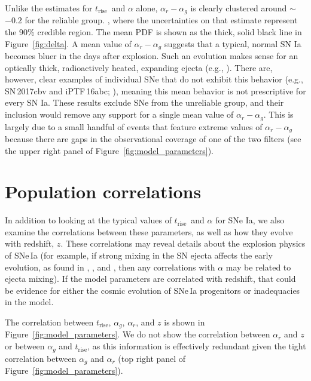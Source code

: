 \documentclass[twocolumn]{./aastex63}
\newcommand{\trise}{$t_\mathrm{rise}$}
\begin{document}
Unlike the estimates for \trise\ and $\alpha$ alone, $\alpha_r - \alpha_g$ is
clearly clustered around $\sim$${-0.2}$ for the reliable group.
, where the uncertainties on that estimate represent
the 90\% credible region. The mean PDF  is shown as the thick, solid black line in
Figure~\ref{fig:delta}. A mean value of $\alpha_r - \alpha_g$ suggests that a
typical, normal SN Ia becomes bluer in the days after explosion. Such an
evolution makes sense for an optically thick, radioactively heated, expanding
ejecta (e.g., \citealt{Piro16,Magee20}). There are, however, clear examples of
individual SNe that do not exhibit this behavior (e.g., SN\,2017cbv and
iPTF\,16abc; \citealt{Hosseinzadeh17,Miller18}), meaning this mean behavior is
not prescriptive for every SN Ia. These results exclude SNe from the
unreliable group, and their inclusion would remove any support for a single
mean value of $\alpha_r - \alpha_g$. This is largely due to a small handful of
events that feature extreme values of $\alpha_r - \alpha_g$ because there are
gaps in the observational coverage of one of the two filters (see the upper
right panel of Figure~\ref{fig:model_parameters}).

\section{Population correlations}

In addition to looking at the typical values of \trise\ and $\alpha$ for SNe
Ia, we also examine the correlations between these parameters, as well as how
they evolve with redshift, $z$. These correlations may reveal details about
the explosion physics of SNe\,Ia (for example, if strong mixing in the SN
ejecta affects the early evolution, as found in \citealt{Piro16},
\citealt{Magee18}, and \citealt{Magee20}, then any correlations with $\alpha$
may be related to ejecta mixing). If the model parameters are correlated with
redshift, that could be evidence for either the cosmic evolution of SNe\,Ia
progenitors or inadequacies in the model.

The correlation between $t_\mathrm{rise}$, $\alpha_g$, $\alpha_r$, and $z$ is
shown in Figure~\ref{fig:model_parameters}. We do not show the correlation
between $\alpha_r$ and $z$ or between $\alpha_g$ and \trise, as this
information is effectively redundant given the tight correlation between
$\alpha_g$ and $\alpha_r$ (top right panel of
Figure~\ref{fig:model_parameters}).
\end{document}
